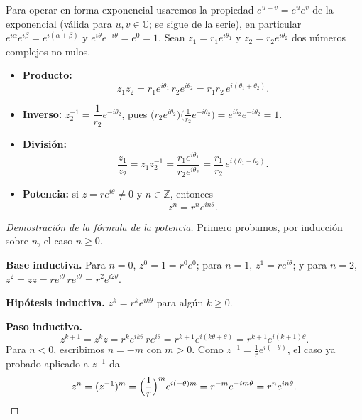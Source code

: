 \documentclass[12pt,a4paper]{book}
\begin{document}
  Para operar en forma exponencial usaremos la propiedad $e^{u+v}=e^ue^v$ de la exponencial (válida para $u,v\in\mathbb{C}$; se sigue de la serie), en particular $e^{i\alpha}e^{i\beta}=e^{i(\alpha+\beta)}$ y $e^{i\theta}e^{-i\theta}=e^0=1$. Sean $z_1=r_1e^{i\theta_1}$ y $z_2=r_2e^{i\theta_2}$ dos números complejos no nulos.

  \begin{itemize}
    \item \textbf{Producto:}
          \begin{equation*}
            z_1z_2=r_1e^{i\theta_1}\,r_2e^{i\theta_2}=r_1r_2\,e^{i(\theta_1+\theta_2)}.
          \end{equation*}
    \item \textbf{Inverso:} $z_2^{-1}=\dfrac{1}{r_2}e^{-i\theta_2}$, pues $\big(r_2e^{i\theta_2}\big)\big(\tfrac{1}{r_2}e^{-i\theta_2}\big)=e^{i\theta_2}e^{-i\theta_2}=1$.
    \item \textbf{División:}
          \begin{equation*}
            \frac{z_1}{z_2}=z_1z_2^{-1}=\frac{r_1e^{i\theta_1}}{r_2e^{i\theta_2}}=\frac{r_1}{r_2}\,e^{i(\theta_1-\theta_2)}.
          \end{equation*}
    \item \textbf{Potencia:} si $z=re^{i\theta}\neq 0$ y $n\in\mathbb{Z}$, entonces
          \begin{equation*}
            z^n=r^ne^{in\theta}.
          \end{equation*}
  \end{itemize}

  \begin{proof}[Demostración de la fórmula de la potencia]
    Primero probamos, por inducción sobre $n$, el caso $n\geq 0$.

    \textbf{Base inductiva.} Para $n=0$, $z^0=1=r^0e^{0}$; para $n=1$, $z^1=re^{i\theta}$; y para $n=2$, $z^2=zz=re^{i\theta}\,re^{i\theta}=r^2e^{i2\theta}$.

    \textbf{Hipótesis inductiva.} $z^k=r^ke^{ik\theta}$ para algún $k\geq 0$.

    \textbf{Paso inductivo.}
    \begin{equation*}
      z^{k+1}=z^kz=r^ke^{ik\theta}\,re^{i\theta}=r^{k+1}e^{i(k\theta+\theta)}=r^{k+1}e^{i(k+1)\theta}.
    \end{equation*}
    Para $n<0$, escribimos $n=-m$ con $m>0$. Como $z^{-1}=\frac{1}{r}e^{i(-\theta)}$, el caso ya probado aplicado a $z^{-1}$ da
    \begin{equation*}
      z^n=(z^{-1})^m=\Big(\frac{1}{r}\Big)^m e^{i(-\theta)m}=r^{-m}e^{-im\theta}=r^ne^{in\theta}.\qedhere
    \end{equation*}
  \end{proof}
\end{document}
